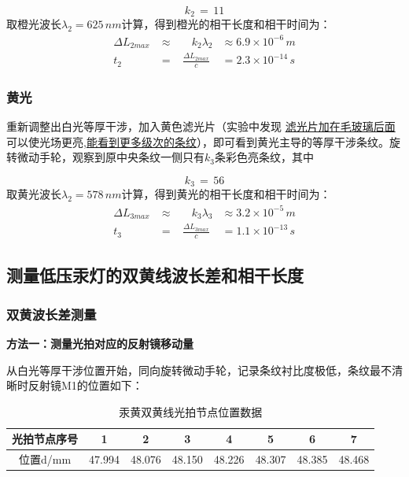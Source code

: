 \documentclass[12pt]{article}
\begin{document}
\begin{equation*}
    k_2\,=\,11
\end{equation*}
取橙光波长$\lambda_2=625\,nm$计算，得到橙光的相干长度和相干时间为：
\begin{equation}
\begin{aligned}
    \Delta L_{2max}&\approx \;\;\;\;\;\;k_2\lambda_2 &\approx 6.9\times 10^{-6}\,m \\
    t_2\;\;\;\;&=\;\;\;\frac{\Delta L_{2max}}{c}&=2.3 \times 10^{-14}\,s
\end{aligned}
\end{equation}

\subsubsection{黄光}
\quad 重新调整出白光等厚干涉，加入黄色滤光片（实验中发现\; \underline{滤光片加在毛玻璃后面}可以使光场更亮,\underline{能看到更多级次的条纹}），即可看到黄光主导的等厚干涉条纹。旋转微动手轮，观察到原中央条纹一侧只有$k_3$条彩色亮条纹，其中

\begin{equation*}
    k_3\,=\,56
\end{equation*}
取黄光波长$\lambda_2=578\,nm$计算，得到黄光的相干长度和相干时间为：
\begin{equation}
\begin{aligned}
    \Delta L_{3max}&\approx \;\;\;\;\;\;k_3\lambda_3 &\approx 3.2\times 10^{-5}\,m \\
    t_3\;\;\;\;&=\;\;\;\frac{\Delta L_{3max}}{c}&=1.1 \times 10^{-13}\,s
\end{aligned}
\end{equation}

\subsection{测量低压汞灯的双黄线波长差和相干长度}
\subsubsection{双黄波长差测量}
\textbf{方法一：测量光拍对应的反射镜移动量}
\vspace{0.2cm}
\par
从白光等厚干涉位置开始，同向旋转微动手轮，记录条纹衬比度极低，条纹最不清晰时反射镜M1的位置如下：
\begin{table}[H]
    \centering
    \begin{tabular}{|c|c|c|c|c|c|c|c|}
        \hline
        光拍节点序号 & 1 & 2 & 3 & 4 & 5 & 6 & 7 \\
        \hline
        位置d/mm & 47.994 & 48.076 & 48.150 & 48.226 & 48.307 & 48.385 & 48.468 \\
        \hline
    \end{tabular}
\caption{汞黄双黄线光拍节点位置数据}
\end{table}
\end{document}
